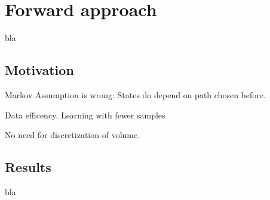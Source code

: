 \section{Forward approach}
\label{chap:forwardlearning}
bla

\subsection{Motivation}
Markov Assumption is wrong: States do depend on path chosen before.

Data efficency. Learning with fewer samples

No need for discretization of volume.

\subsection{Results}
bla





\cleardoublepage{}